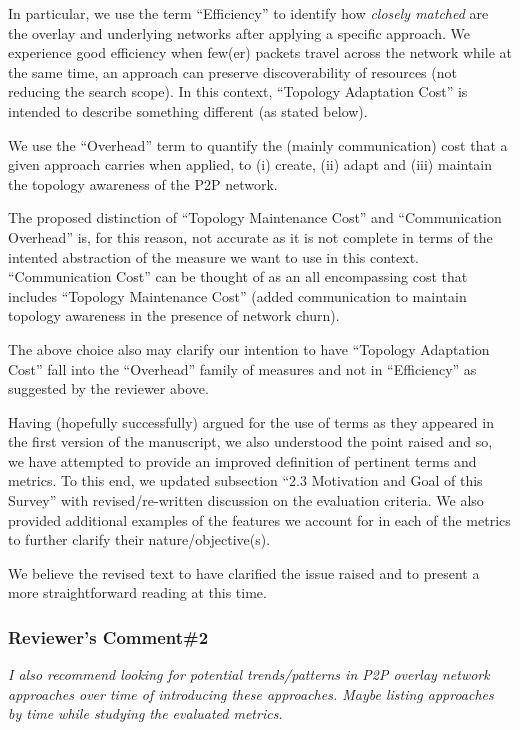 \documentclass[10pt,letterpaper]{article}
\begin{document}
In particular, we use the term ``Efficiency'' to identify how \emph{closely matched} are the
overlay and underlying networks after applying a specific approach. 
We experience good efficiency when few(er) packets travel across the network
while at the same time, an approach can preserve 
discoverability of resources (not reducing the search scope). 
In this context, ``Topology Adaptation Cost'' is intended to describe something 
different (as stated below). 

We use the ``Overhead'' term to quantify the (mainly communication) cost
that a given approach carries when applied, to (i) create, (ii) adapt and (iii) maintain
the topology awareness of the P2P network. 

The proposed distinction of
``Topology Maintenance Cost'' and ``Communication Overhead'' is, for this reason, not
accurate as it is not complete in terms of the intented abstraction of the measure we
want to use in this context.  
``Communication Cost'' can be thought of as an all encompassing cost 
that includes ``Topology Maintenance Cost'' (added communication to maintain topology
awareness in the presence of network churn). 

The above choice also may clarify our intention to have
``Topology Adaptation Cost'' fall into the ``Overhead'' family of measures and
not in ``Efficiency'' as suggested by the reviewer above.

Having (hopefully successfully) argued for the use of terms as they appeared in the 
first version of the manuscript, we also understood the point raised and so, 
we have attempted to provide an improved definition of pertinent terms and metrics.
To this end, we updated
subsection ``2.3 Motivation and Goal of this Survey'' with revised/re-written 
discussion on the evaluation criteria. We also provided additional examples of
the features we account for in each of the metrics to further clarify their
nature/objective(s).

We believe the revised text to have clarified the issue raised and 
to present a more straightforward reading at this time.


\subsubsection*{\textbf{\textsf{Reviewer's Comment\#2}}}
\noindent
\emph{I also recommend looking for potential trends/patterns in P2P overlay network
approaches over time of introducing these approaches. Maybe listing approaches by time
while studying the evaluated metrics.}\\[6pt]
\end{document}
